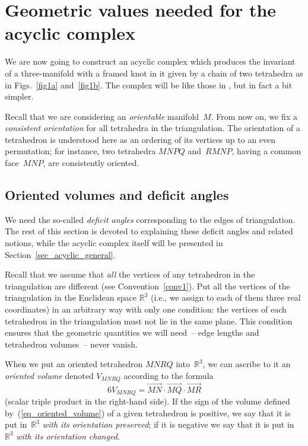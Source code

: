 \section{Geometric values needed for the acyclic complex}
\label{sec_deficit_angles}

We are now going to construct an acyclic complex which produces the invariant of a three-manifold with a framed knot in it given by a chain of two tetrahedra as in Figs.~\ref{fig1a} and~\ref{fig1b}. The complex will be like those in \cite{TMP24, TMP15}, but in fact a bit simpler.

\begin{convention}
\label{conv2}
Recall that we are considering an \emph{orientable} manifold~$M$. From now on, we f\/ix a \emph{consistent orientation} for all tetrahedra in the triangulation. The orientation of a tetrahedron is understood here as an ordering of its vertices up to an even permutation; for instance, two tetrahedra $MNPQ$ and~$RMNP$, having a common face~$MNP$, are consistently oriented.
\end{convention}

\subsection{Oriented volumes and def\/icit angles}
\label{subs_daav}
We need the so-called \emph{deficit angles} corresponding to the edges of triangulation. The rest of this section is devoted to explaining these def\/icit angles and related notions, while the acyclic complex itself will be presented in Section~\ref{sec_acyclic_general}.

Recall that we assume that \emph{all} the vertices of any tetrahedron in the triangulation are dif\/ferent (see Convention~\ref{conv1}). Put all the vertices of the triangulation in the Euclidean space $\mathbb R^3$ (i.e., we assign to each of them three real coordinates) in an arbitrary way with only one condition: the vertices of each tetrahedron in the triangulation must not lie in the same plane. This condition ensures that the geometric quantities we will need~-- edge lengths and tetrahedron volumes~-- never vanish.

When we put an oriented tetrahedron $MNRQ$ into~$\mathbb R^3$, we can ascribe to it an \emph{oriented volume} denoted $V_{MNRQ}$ according to the formula
\begin{equation}
6V_{MNRQ}=\overrightarrow{MN} \cdot \overrightarrow{MQ} \cdot \overrightarrow{MR}
\label{eq_oriented_volume}
\end{equation}
(scalar triple product in the right-hand side). If the sign of the volume def\/ined by~(\ref{eq_oriented_volume}) of a given tetrahedron is positive, we say that it is put in~$\mathbb R^3$ \emph{with its orientation preserved}; if it is negative we say that it is put in~$\mathbb R^3$ \emph{with its orientation changed}.


